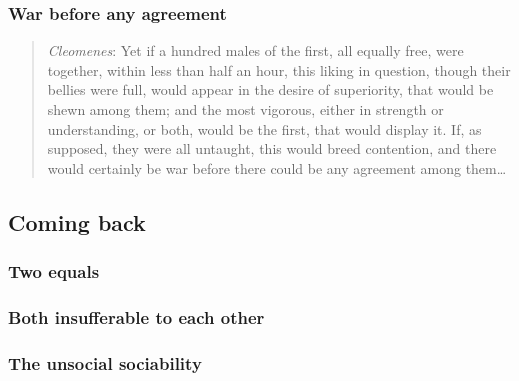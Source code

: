         \subsubsection{War before any agreement}

            \begin{quote}
                \textit{Cleomenes}: Yet if a hundred males of the first, all equally free, were together, within less than half an hour, this liking in question, though their bellies were full, would appear in the desire of superiority, that would be shewn among them; and the most vigorous, either in strength or understanding, or both, would be the first, that would display it. If, as supposed, they were all untaught, this would breed contention, and there would certainly be war before there could be any agreement among them…
            \end{quote}

    \subsection{Coming back}

        \subsubsection{Two equals}

            \begin{quote}
                
            \end{quote}
 
        \subsubsection{Both insufferable to each other}

            \begin{quote}
                
            \end{quote}

        \subsubsection{The unsocial sociability}

            \begin{quote}
                
            \end{quote}

